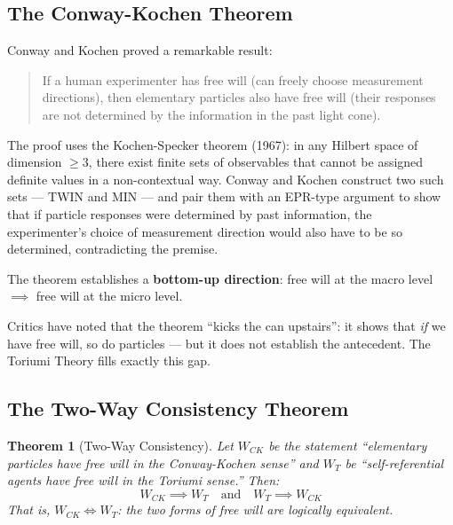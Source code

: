 \documentclass[12pt,a4paper]{article}
\newtheorem{theorem}{Theorem}[section]
\theoremstyle{definition}
\theoremstyle{remark}
\begin{document}
\subsection{The Conway-Kochen Theorem}

Conway and Kochen \cite{conway2006, conway2009} proved a remarkable result:

\begin{quote}
If a human experimenter has free will (can freely choose measurement
directions), then elementary particles also have free will (their responses
are not determined by the information in the past light cone).
\end{quote}

The proof uses the Kochen-Specker theorem (1967): in any Hilbert space of
dimension $\geq 3$, there exist finite sets of observables that cannot be
assigned definite values in a non-contextual way. Conway and Kochen construct
two such sets --- TWIN and MIN --- and pair them with an EPR-type argument to
show that if particle responses were determined by past information, the
experimenter's choice of measurement direction would also have to be so
determined, contradicting the premise.

The theorem establishes a \textbf{bottom-up direction}: free will at the macro
level $\implies$ free will at the micro level.

Critics have noted that the theorem ``kicks the can upstairs'': it shows that
\emph{if} we have free will, so do particles --- but it does not establish the
antecedent. The Toriumi Theory fills exactly this gap.

\subsection{The Two-Way Consistency Theorem}

\begin{theorem}[Two-Way Consistency]\label{thm:twoway}
Let $W_{CK}$ be the statement ``elementary particles have free will in the
Conway-Kochen sense'' and $W_T$ be ``self-referential agents have free will
in the Toriumi sense.'' Then:
\begin{equation}
W_{CK} \implies W_T \quad \text{and} \quad W_T \implies W_{CK}
\end{equation}
That is, $W_{CK} \iff W_T$: the two forms of free will are \emph{logically
equivalent}.
\end{theorem}
\end{document}
